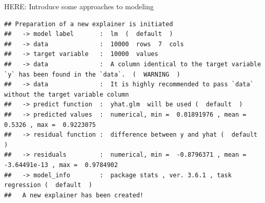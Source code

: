 \documentclass[12pt,]{krantz}
\newenvironment{Shaded}{\begin{snugshade}}{\end{snugshade}}
\newcommand{\DataTypeTok}[1]{\textcolor[rgb]{0.13,0.29,0.53}{#1}}
\newcommand{\DecValTok}[1]{\textcolor[rgb]{0.00,0.00,0.81}{#1}}
\newcommand{\KeywordTok}[1]{\textcolor[rgb]{0.13,0.29,0.53}{\textbf{#1}}}
\newcommand{\NormalTok}[1]{#1}
\newcommand{\OperatorTok}[1]{\textcolor[rgb]{0.81,0.36,0.00}{\textbf{#1}}}
\newcommand{\OtherTok}[1]{\textcolor[rgb]{0.56,0.35,0.01}{#1}}
\newcommand{\StringTok}[1]{\textcolor[rgb]{0.31,0.60,0.02}{#1}}
\begin{document}
HERE: Introduce some approaches to modeling

\begin{Shaded}
\end{Shaded}

\begin{verbatim}
## Preparation of a new explainer is initiated
##   -> model label       :  lm  (  default  )
##   -> data              :  10000  rows  7  cols 
##   -> target variable   :  10000  values 
##   -> data              :  A column identical to the target variable `y` has been found in the `data`.  (  WARNING  )
##   -> data              :  It is highly recommended to pass `data` without the target variable column
##   -> predict function  :  yhat.glm  will be used (  default  )
##   -> predicted values  :  numerical, min =  0.01891976 , mean =  0.5326 , max =  0.9223075  
##   -> residual function :  difference between y and yhat (  default  )
##   -> residuals         :  numerical, min =  -0.8796371 , mean =  -3.64491e-13 , max =  0.9784902  
##   -> model_info        :  package stats , ver. 3.6.1 , task regression (  default  ) 
##   A new explainer has been created!
\end{verbatim}
\end{document}

